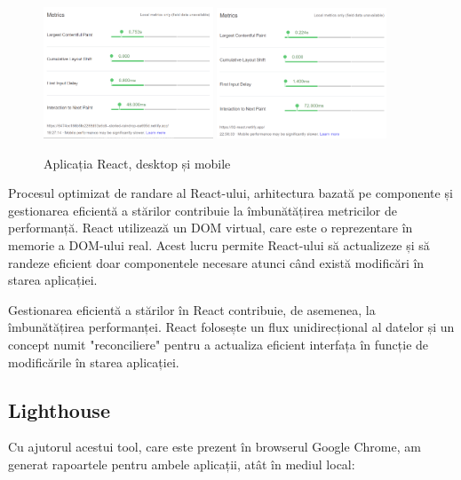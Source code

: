 \documentclass[12pt, a4paper]{report}
\begin{document}
\begin{figure}[htbp]
	\centering
	\includegraphics[width=0.45\textwidth]{02_desktop_deployed.png}
	\includegraphics[width=0.45\textwidth]{02_mobile_deployed.png}
	\caption{Aplicația React, desktop și mobile}
	\label{fig:02-deployed}
\end{figure}

Procesul optimizat de randare al React-ului, arhitectura bazată pe componente și gestionarea eficientă a stărilor contribuie la îmbunătățirea metricilor de performanță. React utilizează un DOM virtual, care este o reprezentare în memorie a DOM-ului real. Acest lucru permite React-ului să actualizeze și să randeze eficient doar componentele necesare atunci când există modificări în starea aplicației.

Gestionarea eficientă a stărilor în React contribuie, de asemenea, la îmbunătățirea performanței. React folosește un flux unidirecțional al datelor și un concept numit "reconciliere" pentru a actualiza eficient interfața în funcție de modificările în starea aplicației.
\subsection{Lighthouse}

Cu ajutorul acestui tool, care este prezent în browserul Google Chrome, am generat rapoartele pentru ambele aplicații, atât în mediul local:
\end{document}
